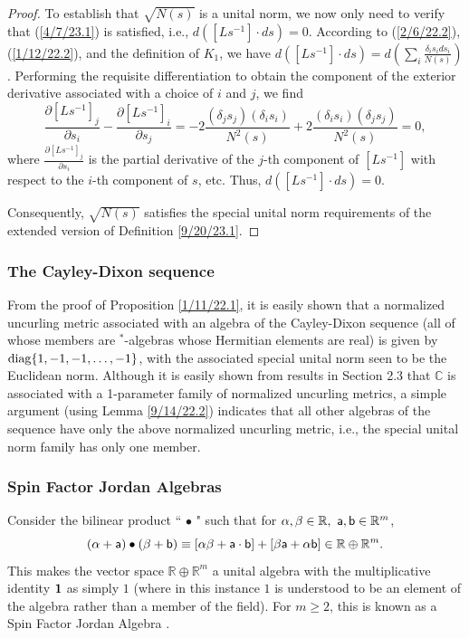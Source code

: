 \documentclass{amsart}
\numberwithin{equation}{section}
\theoremstyle{definition}
\numberwithin{theorem}{section}
\begin{document}
\begin{proof}
 To establish that $\sqrt{N(s)}$ is a unital norm, we  now only need to verify that (\ref{4/7/23.1}) is satisfied, i.e., $d\left([Ls^{-1}]\cdot ds\right)=0$.  According to (\ref{2/6/22.2}), (\ref{1/12/22.2}), and the definition  of $K_1$, we have $d\left([Ls^{-1}]\cdot ds\right) = d\left(\sum_i \frac{\delta_is_i ds_i}{N(s)}\right)$.  Performing the requisite differentiation to obtain the component of the exterior derivative associated with a choice of $i$ and $j$, we find \[ \frac{\partial [Ls^{-1}]_j}{\partial s_i} - \frac{\partial [Ls^{-1}]_i}{\partial s_j} = -2\frac{(\delta_j s_j)(\delta_i s_i)}{N^2(s)} +
2\frac{(\delta_i s_i)(\delta_j s_j)}{N^2(s)} = 0,  \] where $\frac{\partial [Ls^{-1}]_j}{\partial s_i}$ is the partial derivative of the $j$-th component of $[Ls^{-1}]$ with respect to the $i$-th component of $s$, etc. Thus,  $d\left([Ls^{-1}]\cdot ds\right) = 0$.

Consequently, $\sqrt{N(s)}$ satisfies the special unital norm requirements of the extended version of Definition \ref{9/20/23.1}.  
\end{proof}


\subsubsection{The Cayley-Dixon sequence}  From the proof of Proposition \ref{1/11/22.1}, it is easily shown that a normalized uncurling metric associated with an algebra of the Cayley-Dixon sequence (all of whose members are $^*$-algebras whose Hermitian elements are real) is given by ${\rm diag}\{1,-1,-1,\dots,-1\}$, with the associated special unital norm seen to be the Euclidean norm. Although it is easily shown from results in Section 2.3 that $\mathbb{C}$ is associated with a 1-parameter family of normalized uncurling metrics, a simple argument (using Lemma \ref{9/14/22.2}) indicates that all other algebras of the sequence have only the above normalized uncurling metric, i.e., the special unital norm family has only one member.  
 
\subsubsection{Spin Factor Jordan Algebras}  Consider the bilinear product ``$\,\bullet\,$" such that for
$\alpha,\beta\in \mathbb{R},\,\, {\sf a},{\sf b}\in \mathbb{R}^m$,  \begin{equation}  (\alpha+ {\sf a})\bullet (\beta + {\sf b}) \equiv
    [\alpha \beta + {\sf a} \cdot {\sf b}] + [ \beta {\sf a} + \alpha {\sf b}] \in \mathbb{R}\oplus \mathbb{R}^m. \label{12/24/18.1}\end{equation}  This makes the vector space $\mathbb{R}\oplus \mathbb{R}^m$ a unital algebra with the multiplicative identity ${\bf 1}$ as simply $1$ (where in this instance $1$ is understood to be an element of the algebra rather than a member of the field).  For $m\ge 2$, this is known as a Spin Factor Jordan Algebra \cite{mccrimmon:2004}.
\end{document}
